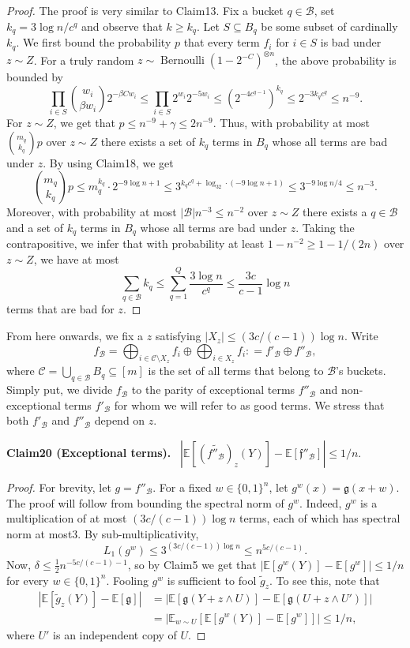 \documentclass[10pt,a4paper]{article}
\newenvironment{authorclaim}[1]{\par\medskip\noindent\textbf{#1.}\ \ignorespaces}{\par\medskip}
\begin{document}
\begin{proof}
The proof is very similar to Claim13. Fix a bucket $q\in\mathcal B$, set $k_q=3\log n/c^q$ and observe that $k\ge k_q$. Let $S\subseteq B_q$ be some subset of cardinally $k_q$. We first bound the probability $p$ that every term $f_i$ for $i\in S$ is bad under $z\sim Z$.
For a truly random $z\sim\operatorname{Bernoulli}(1-2^{-C})^{\otimes n}$, the above probability is bounded by
\[
\prod_{i\in S}\binom{w_i}{\beta w_i}2^{-\beta Cw_i}
\le\prod_{i\in S}2^{w_i}2^{-5w_i}
\le(2^{-4c^{q-1}})^{k_q}
\le2^{-3k_qc^q}\le n^{-9}.
\]
For $z\sim Z$, we get that $p\le n^{-9}+\gamma\le2n^{-9}$. Thus, with probability at most $\binom{m_q}{k_q}p$ over $z\sim Z$ there exists a set of $k_q$ terms in $B_q$ whose all terms are bad under $z$. By using Claim18, we get
\[
\binom{m_q}{k_q}p\le m_q^{k_q}\cdot2^{-9\log n+1}
\le3^{k_qc^q+\log_32\cdot(-9\log n+1)}
\le3^{-9\log n/4}\le n^{-3}.
\]
Moreover, with probability at most $|\mathcal B|n^{-3}\le n^{-2}$ over $z\sim Z$ there exists a $q\in\mathcal B$ and a set of $k_q$ terms in $B_q$ whose all terms are bad under $z$. Taking the contrapositive, we infer that with probability at least $1-n^{-2}\ge1-1/(2n)$ over $z\sim Z$, we have at most
\[
\sum_{q\in\mathcal B}k_q\le\sum_{q=1}^Q\frac{3\log n}{c^q}\le\frac{3c}{c-1}\log n
\]
terms that are bad for $z$.
\end{proof}
From here onwards, we fix a $z$ satisfying $|X_z|\le(3c/(c-1))\log n$. Write
\[
f_{\mathcal B}=\bigoplus_{i\in\mathcal C\setminus X_z}f_i\oplus\bigoplus_{i\in X_z}f_i
\mathrel{\mathop:}=f'_{\mathcal B}\oplus f''_{\mathcal B},
\]
where $\mathcal C=\bigcup_{q\in\mathcal B}B_q\subseteq[m]$ is the set of all terms that belong to $\mathcal B$'s buckets. Simply put, we divide $f_{\mathcal B}$ to the parity of exceptional terms $f''_{\mathcal B}$ and non-exceptional terms $f'_{\mathcal B}$ for whom we will refer to as good terms. We stress that both $f'_{\mathcal B}$ and $f''_{\mathcal B}$ depend on $z$.
\begin{authorclaim}{Claim20 (Exceptional terms)}
$|\mathbb E[(\widetilde{f''_{\mathcal B}})_z(Y)]-\mathbb E[\mathfrak f''_{\mathcal B}]|\le1/n$.
\end{authorclaim}
\begin{proof}
For brevity, let $g=f''_{\mathcal B}$. For a fixed $w\in\{0,1\}^n$, let $g^w(x)=\mathfrak g(x+w)$. The proof will follow from bounding the spectral norm of $g^w$. Indeed, $g^w$ is a multiplication of at most $(3c/(c-1))\log n$ terms, each of which has spectral norm at most3. By sub-multiplicativity,
\[
L_1(g^w)\le3^{(3c/(c-1))\log n}\le n^{5c/(c-1)}.
\]
Now, $\delta\le\frac12n^{-5c/(c-1)-1}$, so by Claim5 we get that $|\mathbb E[g^w(Y)]-\mathbb E[g^w]|\le1/n$ for every $w\in\{0,1\}^n$.
Fooling $g^w$ is sufficient to fool $\widetilde g_z$. To see this, note that
\begin{align*}
|\mathbb E[\widetilde g_z(Y)]-\mathbb E[\mathfrak g]|
&=|\mathbb E[\mathfrak g(Y+z\wedge U)]-\mathbb E[\mathfrak g(U+z\wedge U')]|\\
&=\left|\mathbb E_{w\sim U}[\mathbb E[g^w(Y)]-\mathbb E[g^w]]\right|\le1/n,
\end{align*}
where $U'$ is an independent copy of $U$.
\end{proof}
\end{document}
